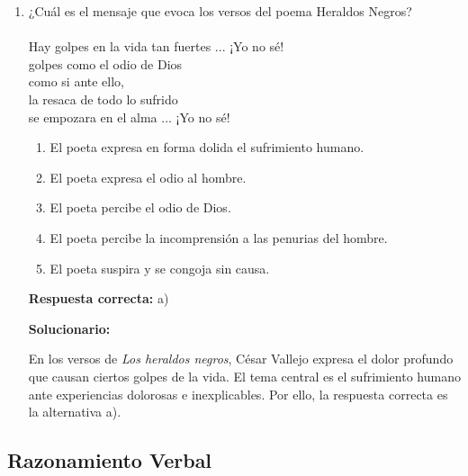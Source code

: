 \begin{enumerate}[resume]
	
	\item ¿Cuál es el mensaje que evoca los versos del poema Heraldos Negros?\\\\
	Hay golpes en la vida tan fuertes ... ¡Yo no sé!\\
	golpes como el odio de Dios\\
	como si ante ello,\\
	la resaca de todo lo sufrido\\
	se empozara en el alma ... ¡Yo no sé!
	
	\begin{enumerate}[label=\alph*)]
		\item El poeta expresa en forma dolida el sufrimiento humano.
		\item El poeta expresa el odio al hombre.
		\item El poeta percibe el odio de Dios.
		\item El poeta percibe la incomprensión a las penurias del hombre.
		\item El poeta suspira y se congoja sin causa.
	\end{enumerate}
	
	\textbf{Respuesta correcta:} a)
	
	\vspace{2mm}
	\textbf{Solucionario:}
	
	En los versos de \textit{Los heraldos negros}, César Vallejo expresa el dolor profundo que causan ciertos golpes de la vida. El tema central es el sufrimiento humano ante experiencias dolorosas e inexplicables. Por ello, la respuesta correcta es la alternativa a).
	
\end{enumerate}

\subsection*{Razonamiento Verbal}

